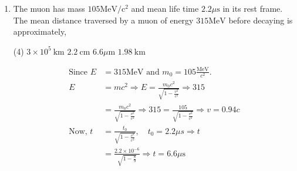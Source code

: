 \begin{enumerate}
	\textbf{A}. The energy of $\pi^{-}$is
{	}
\begin{tasks}(4)
\task[\textbf{A.}] $\frac{\left(M_{\tau}^{2}-M_{\pi}^{2}\right) c^{2}}{2 M_{\tau}}$
\task[\textbf{B.}] $\frac{\left(M_{\tau}^{2}+M_{\pi}^{2}\right) c^{2}}{2 M_{\tau}}$
\task[\textbf{C.}] $\left(M_{\tau}-M_{\pi}\right) c^{2}$
\task[\textbf{D.}] $\sqrt{M_{\tau} M_{\pi}} c^{2}$
\end{tasks}
\begin{answer}
\begin{align*}
\tau^{-} \rightarrow \pi^{-}+v_{\tau}&\\
\text{From conservation of energy }\mathrm{M}_{\tau} \mathrm{c}^{2}&=\mathrm{E}_{\pi}+\mathrm{E}_{\mathrm{v}}
\intertext{$E_{\pi}^{2}=p^{2} c^{2}+M_{\pi}^{2} c^{4}$ and $E_{v}^{2}=p^{2} c^{2}$ since momentum of $\pi^{-}$and $v_{\tau}$ is same.}
M_{\tau} c^{2}&=E_{\pi}+E_{v}, M_{\pi}^{2} c^{4}\\&=E_{\pi}^{2}-E_{v}^{2} \Rightarrow E_{\pi}-E_{v}=\frac{M_{\pi}^{2} c^{4}}{M_{\tau} c^{2}}\\
E_{\pi}-E_{v}&=\frac{M_{\pi}^{2} c^{2}}{M_{\tau}}\text{ and }E_{\pi}+E_{v}\\&=M_{\tau} c^{2} \Rightarrow E_{\pi}=\frac{\left(M_{\tau}^{2}+M_{\pi}^{2}\right) c^{2}}{2 M_{\tau}}
\end{align*}
So the correct answer is \textbf{Option (B)}
\end{answer}
	\item The muon has mass $105 \mathrm{MeV} / \mathrm{c}^{2}$ and mean life time $2.2 \mu \mathrm{s}$ in its rest frame. The mean distance traversed by a muon of energy $315 \mathrm{MeV}$ before decaying is approximately,
{	}
\begin{tasks}(4)
\task[\textbf{A.}] $3 \times 10^{5} \mathrm{~km}$
\task[\textbf{B.}] $2.2 \mathrm{~cm}$
\task[\textbf{C.}] $6.6 \mu \mathrm{m}$
\task[\textbf{D.}] $1.98 \mathrm{~km}$
\end{tasks}
\begin{answer}
\begin{align*}
\text{Since }E&=315 \mathrm{MeV}\text{ and }m_{0}=105 \frac{\mathrm{MeV}}{c^{2}}.\\
E&=m c^{2} \Rightarrow E=\frac{m_{0} c^{2}}{\sqrt{1-\frac{v^{2}}{c^{2}}}} \Rightarrow 315\\&=\frac{m_{0} c^{2}}{\sqrt{1-\frac{v^{2}}{c^{2}}}} \Rightarrow 315=\frac{105}{\sqrt{1-\frac{v^{2}}{c^{2}}}} \Rightarrow v=0.94 c\\
\text{Now, }t&=\frac{t_{0}}{\sqrt{1-\frac{v^{2}}{c^{2}}}}, \quad t_{0}=2.2 \mu s \Rightarrow t\\&=\frac{2.2 \times 10^{-6}}{\sqrt{1-\frac{8}{9}}} \Rightarrow t=6.6 \mu \mathrm{s}

\end{align*}
\end{answer}
\end{enumerate}
